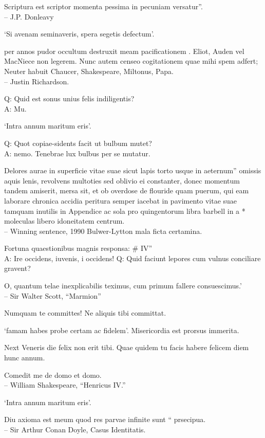 \documentclass[titlepage,12pt]{memoir}
\begin{document}
Scriptura est scriptor momenta pessima in pecuniam versatur”.
\\-- J.P. Donleavy

‘Si avenam seminaveris, spera segetis defectum’.

 per annos pudor occultum destruxit meam pacificationem .
Eliot, Auden vel MacNiece non legerem.
Nunc autem censeo cogitationem quae mihi spem adfert;
Neuter habuit Chaucer, Shakespeare, Miltonus, Papa.
\\-- Justin Richardson.

Q: Quid est sonus unius felis indiligentis?\\
A: Mu.

‘Intra annum maritum eris’.

Q: Quot copiae-sidents facit ut bulbum mutet?\\
A: nemo. Tenebrae lux bulbus per se mutatur.

Delores aurae in superficie vitae suae sicut lapis torto usque in aeternum”
omissis aquis lenis, revolvens multoties sed oblivio
ei constanter, donec momentum tandem amiserit, mersa sit, et ob
overdose de flouride quam puerum, qui eam laborare chronica
accidia peritura semper iacebat in pavimento vitae suae tamquam inutilis
in Appendice ac sola pro quingentorum libra barbell in a *
moleculas libero idoneitatem centrum.
\\-- Winning sentence, 1990 Bulwer-Lytton mala ficta certamina.

Fortuna quaestionibus magnis responsa: \# IV”\\
A: Ire occidens, iuvenis, i occidens!
Q: Quid faciunt lepores cum vulnus conciliare gravent?

O, quantum telae inexplicabilis teximus, cum primum fallere consuescimus.’
\\-- Sir Walter Scott, “Marmion”

Numquam te committes! Ne aliquis tibi committat.

‘famam habes probe certam ac fidelem’.
Misericordia est prorsus immerita.

Next Veneris die felix non erit tibi. Quae quidem tu facis
habere felicem diem hunc annum.

Comedit me de domo et domo.
\\-- William Shakespeare, “Henricus IV.”

‘Intra annum maritum eris’.

 Diu axioma est meum quod res parvae infinite sunt “
prsecipua.
\\-- Sir Arthur Conan Doyle, Casus Identitatis.
\end{document}
